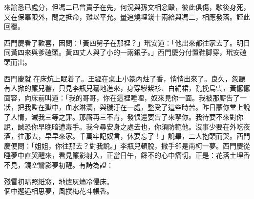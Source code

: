\begin{myquote}[\markfont]
來諭悉已處分，但馮二已曾責子在先，何況與孫文相忿毆，彼此俱傷，歇後身死，又在保辜限外，問之抵命，難以平允。量追燒埋錢十兩給與馮二，相應發落。謹此回覆。

\end{myquote}

西門慶看了歡喜，因問：「黃四舅子在那裡？」玳安道：「他出來都往家去了。明日同黃四來與爹磕頭。黃四丈人與了小的一兩銀子。」西門慶分付置鞋脚穿，玳安磕頭而出。

西門慶就𢱉在床炕上眠着了。王經在桌上小篆內炷了香，悄悄出來了。良久，忽聽有人掀的簾兒響，只見李瓶兒驀地進來，身穿糝紫衫、白絹裙，亂挽烏雲，黃懨懨面容，向床前叫道：「我的哥哥，你在這裡睡哩，奴來見你一面。我被那厮告了一狀，把我監在獄中，血水淋漓，與穢汙在一處，整受了這些時苦。昨日蒙你堂上說了人情，{}減我三等之罪。那厮再三不肯，發恨還要告了來拏你。我待要不來對你說，誠恐你早晚暗遭毒手。{}我今尋安身之處去也，你須防範他。沒事少要在外吃夜酒，往那去，早早來家。千萬牢記奴言，休要忘了！」說畢，二人抱頭而哭。西門慶便問：「姐姐，你往那去？對我說。」李瓶兒頓脫，撒手卻是南柯一夢。西門慶從睡夢中直哭醒來，看見簾影射入，正當日午，繇不的心中痛切。正是：花落土埋香不見，鏡空鸞影夢初醒。有詩為證：

\begin{myquote} 
殘雪初晴照紙窓，地爐灰燼冷侵床。\\個中邂逅相思夢，風撲梅花斗帳香。
\end{myquote} 

